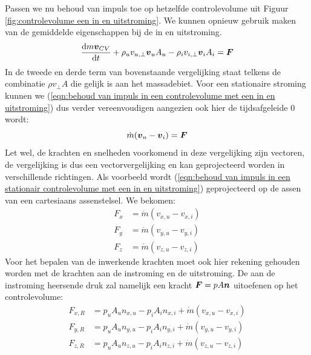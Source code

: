 Passen we nu behoud van impuls toe op hetzelfde controlevolume uit Figuur \ref{fig:controlevolume een in en uitstroming}. We kunnen opnieuw gebruik maken van de gemiddelde eigenschappen bij de in en uitstroming.
\begin{equation}
	 \dfrac{\mathrm{d} m \boldsymbol{v}_{CV}}{\mathrm{d} t} + \rho_{u} v_{u,\perp} \boldsymbol{v}_{u} A_{u} - \rho_{i} v_{i,\perp} \boldsymbol{v}_{i} A_{i} = \boldsymbol{F}
	\label{eqn:behoud van impuls in een controlevolume met een in en uitstroming}
\end{equation}
In de tweede en derde term van bovenstaande vergelijking staat telkens de combinatie $\rho v_{\perp} A$ die gelijk is aan het massadebiet. Voor een stationaire stroming kunnen we (\ref{eqn:behoud van impuls in een controlevolume met een in en uitstroming}) dus verder vereenvoudigen aangezien ook hier de tijdsafgeleide $0$ wordt:
\begin{equation}
	\dot{m} (\boldsymbol{v}_u-\boldsymbol{v}_i) = \boldsymbol{F}
	\label{eqn:behoud van impuls in een stationair controlevolume met een in en uitstroming}
\end{equation}
Let wel, de krachten en snelheden voorkomend in deze vergelijking zijn vectoren, de vergelijking is dus een vectorvergelijking en kan geprojecteerd worden in verschillende richtingen. Als voorbeeld wordt (\ref{eqn:behoud van impuls in een stationair controlevolume met een in en uitstroming}) geprojecteerd op de assen van een cartesiaans assenstelsel. We bekomen:
\begin{align}
	F_x &= \dot{m} (v_{x,u}-v_{x,i}) \nonumber \\
	F_y &= \dot{m} (v_{y,u}-v_{y,i}) \\
	F_z &= \dot{m} (v_{z,u}-v_{z,i}) \nonumber
	\label{eqn:behoud van impuls in een stationair controlevolume met een in en uitstroming geprojecteerd}
\end{align}
Voor het bepalen van de inwerkende krachten moet ook hier rekening gehouden worden met de krachten aan de instroming en de uitstroming. De aan de instroming heersende druk zal namelijk een kracht $\boldsymbol{F} = p A \boldsymbol{n}$ uitoefenen op het controlevolume:
\begin{align}
	F_{x,R} &= p_{u} A_u n_{x,u} - p_{i} A_i n_{x,i} + \dot{m} (v_{x,u}-v_{x,i}) \nonumber \\
	F_{y,R} &= p_{u} A_u n_{y,u} - p_{i} A_i n_{y,i} + \dot{m} (v_{y,u}-v_{y,i}) \\
	F_{z,R} &= p_{u} A_u n_{z,u} - p_{i} A_i n_{z,i} + \dot{m} (v_{z,u}-v_{z,i}) \nonumber
	\label{eqn:behoud van impuls in een stationair controlevolume met een in en uitstroming geprojecteerd2}
\end{align}

